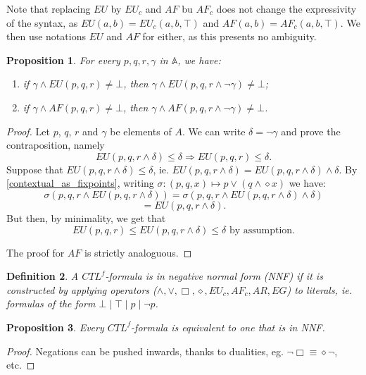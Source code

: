 \documentclass[11pt]{article}
\newcommand{\A}{{\mathbb A}}
\newtheorem{definition}{Definition}[section]
\newtheorem{proposition}[definition]{Proposition}
\begin{document}
Note that replacing $EU$ by $EU_c$ and $AF$ bu $AF_c$ does not change the expressivity of the syntax, as $EU(a,b)=EU_c(a,b,\top)$ and $AF(a,b)=AF_c(a,b,\top)$. We then use notations $EU$ and $AF$ for either, as this presents no ambiguity.
\begin{proposition}\label{context_rule_gamma}
    For every $p,q,r,\gamma$ in $\A$, we have:
    \begin{enumerate}
        \item if $\gamma \wedge EU(p,q,r) \neq \bot$, then $\gamma \wedge EU(p,q,r\wedge\neg\gamma)\neq\bot$;
        \item if $\gamma \wedge AF(p,q,r) \neq \bot$, then $\gamma \wedge AF(p,q,r\wedge\neg\gamma)\neq\bot$.
    \end{enumerate}
\end{proposition}
\begin{proof}
    Let $p$, $q$, $r$ and $\gamma$ be elements of $A$. We can write $\delta = \neg\gamma$ and prove the contraposition, namely\[EU(p,q,r\wedge \delta)\leq \delta\Rightarrow EU(p,q,r)\leq \delta.\] Suppose that $EU(p,q,r\wedge \delta)\leq \delta$, ie. $EU(p,q,r\wedge \delta)=EU(p,q,r\wedge \delta)\wedge\delta$. By \ref{contextual_as_fixpoints}, writing $\sigma: (p,q,x)\mapsto p\vee(q\wedge\diamond x) $ we have:\[\sigma(p,q,r\wedge EU(p,q,r\wedge \delta))=\sigma(p,q,r\wedge EU(p,q,r\wedge \delta)\wedge\delta)\]\[=EU(p,q,r\wedge \delta).\]But then, by minimality, we get that \[EU(p,q,r)\leq EU(p,q,r\wedge \delta)\leq\delta\mbox{ by assumption.}\]
    
    The proof for $AF$ is strictly analoguous.
\end{proof}

\begin{definition}\label{NNF}
    A $CTL^f$-formula is in \emph{negative normal form (NNF)} if it is constructed by applying operators ($\wedge,\vee,\Box,\diamond,EU_c,AF_c,AR,EG$) to literals, ie. formulas of the form $\bot\mid\top\mid p\mid \neg p$.
\end{definition} 
\begin{proposition}\label{equiv_NNF}
    Every $CTL^f$-formula is equivalent to one that is in NNF.
\end{proposition}
\begin{proof}
    Negations can be pushed inwards, thanks to dualities, eg. $\neg\Box\equiv\diamond\neg$, etc.
\end{proof}
\end{document}
